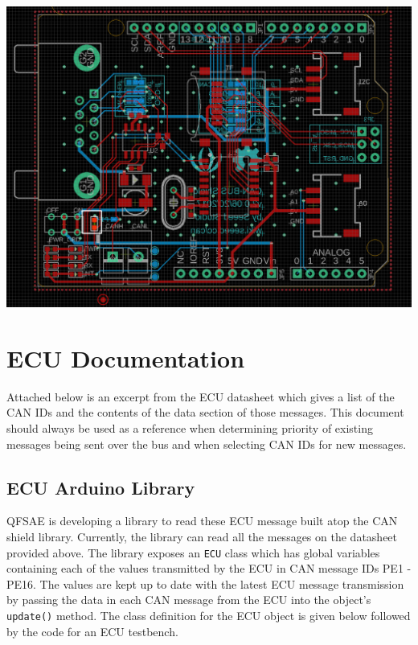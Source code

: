 \documentclass[letterpaper]{article}
\begin{document}
\begin{center}
  \includegraphics[width=\textwidth]{terminating-resistor}
\end{center}

\section{ECU Documentation}
Attached below is an excerpt from the ECU datasheet which
gives a list of the CAN IDs and the contents of the data section of those
messages. This document should always be used as a reference when determining
priority of existing messages being sent over the bus and when selecting CAN IDs
for new messages.\\



\subsection{ECU Arduino Library}
QFSAE is developing a library to read these ECU message built atop the
CAN shield library. Currently, the library can read all the messages on 
the datasheet provided above. The library exposes an \lstinline{ECU} class
which has global variables containing each of the values transmitted by
the ECU in CAN message IDs PE1 - PE16. The values are kept up to date with the
latest ECU message transmission by passing the data in each CAN message from the
ECU into the object's \lstinline{update()} method. The class definition for the
ECU object is given below followed by the code for an ECU testbench.\\
\end{document}
